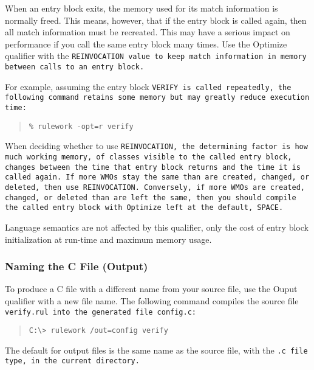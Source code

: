 When an entry block exits, the memory used for its match information
is normally freed. This means, however, that if the entry block is
called again, then all match information must be recreated. This may
have a serious impact on performance if you call the same entry block
many times. Use the Optimize qualifier with the \tt{REINVOCATION}
value to keep match information in memory between calls to an entry
block.

For example, assuming the entry block \tt{VERIFY} is called
repeatedly, the following command retains some memory but
may greatly reduce execution time:

\begin{quote}
\begin{verbatim}
% rulework -opt=r verify
\end{verbatim}
\end{quote}

When deciding whether to use \tt{REINVOCATION}, the determining factor
is how much working memory, of classes visible to the called entry
block, changes between the time that entry block returns and the time
it is called again. If more WMOs stay the same than are created,
changed, or deleted, then use \tt{REINVOCATION}. Conversely, if more WMOs
are created, changed, or deleted than are left the same, then you
should compile the called entry block with Optimize left at the
default, \tt{SPACE}.

\begin{note}
  Language semantics are not affected by this qualifier, only the cost
  of entry block initialization at run-time and maximum memory usage.
\end{note}

\subsubsection{Naming the C File (Output)}

To produce a C file with a different name from your source file, use
the Ouput qualifier with a new file name. The following command
compiles the source file \tt{verify.rul} into the generated file
\tt{config.c}:

\begin{quote}
\begin{verbatim}
C:\> rulework /out=config verify
\end{verbatim}
\end{quote}  

The default for output files is the same name as the
source file, with the \tt{.c} file type, in the current
directory.

